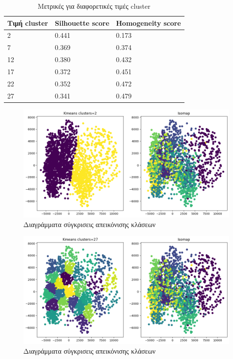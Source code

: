 \begin{table}[ht]
	\centering
	\caption{Μετρικές για διαφορετικές τιμές cluster}
	\begin{tabular}{l | l | l}
		Τιμή cluster & Silhouette score &  Homogeneity score\\
		\hline
		2 & 0.441 & 0.173\\
		7 & 0.369 & 0.374\\
		12 & 0.380&0.432\\
		17 & 0.372 & 0.451\\
		22 &0.352 & 0.472\\
		27 & 0.341 & 0.479\\
	\end{tabular}
	
	\label{tab:abc2}
\end{table}
\begin{figure}[ht]
	\centering
	\includegraphics[width=1\linewidth]{Imagedata1/k_2isomap.png}
	\caption{ Διαγράμματα σύγκρισεις απεικόνισης κλάσεων }
	\label{f:g8}	
\end{figure}
\begin{figure}[ht]
	\centering
	\includegraphics[width=1\linewidth]{Imagedata1/k_27isomap.png}
	\caption{ Διαγράμματα σύγκρισεις απεικόνισης κλάσεων }
	\label{f:g9}	
\end{figure}
\clearpage

